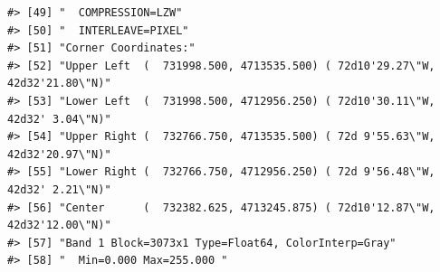 \documentclass[
]{book}
\begin{document}
\begin{verbatim}
#> [49] "  COMPRESSION=LZW"                                                                                                                                                                                                                                                              
#> [50] "  INTERLEAVE=PIXEL"                                                                                                                                                                                                                                                             
#> [51] "Corner Coordinates:"                                                                                                                                                                                                                                                            
#> [52] "Upper Left  (  731998.500, 4713535.500) ( 72d10'29.27\"W, 42d32'21.80\"N)"                                                                                                                                                                                                      
#> [53] "Lower Left  (  731998.500, 4712956.250) ( 72d10'30.11\"W, 42d32' 3.04\"N)"                                                                                                                                                                                                      
#> [54] "Upper Right (  732766.750, 4713535.500) ( 72d 9'55.63\"W, 42d32'20.97\"N)"                                                                                                                                                                                                      
#> [55] "Lower Right (  732766.750, 4712956.250) ( 72d 9'56.48\"W, 42d32' 2.21\"N)"                                                                                                                                                                                                      
#> [56] "Center      (  732382.625, 4713245.875) ( 72d10'12.87\"W, 42d32'12.00\"N)"                                                                                                                                                                                                      
#> [57] "Band 1 Block=3073x1 Type=Float64, ColorInterp=Gray"                                                                                                                                                                                                                             
#> [58] "  Min=0.000 Max=255.000 "                                                                                                                                                                                                                                                       

\end{verbatim}
\end{document}
